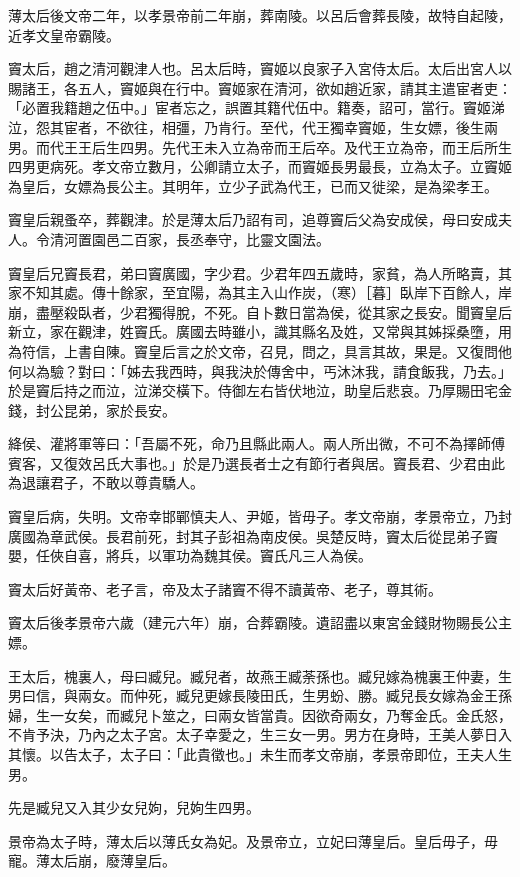 \begin{pinyinscope}
薄太后後文帝二年，以孝景帝前二年崩，葬南陵。以呂后會葬長陵，故特自起陵，近孝文皇帝霸陵。

竇太后，趙之清河觀津人也。呂太后時，竇姬以良家子入宮侍太后。太后出宮人以賜諸王，各五人，竇姬與在行中。竇姬家在清河，欲如趙近家，請其主遣宦者吏：「必置我籍趙之伍中。」宦者忘之，誤置其籍代伍中。籍奏，詔可，當行。竇姬涕泣，怨其宦者，不欲往，相彊，乃肯行。至代，代王獨幸竇姬，生女嫖，後生兩男。而代王王后生四男。先代王未入立為帝而王后卒。及代王立為帝，而王后所生四男更病死。孝文帝立數月，公卿請立太子，而竇姬長男最長，立為太子。立竇姬為皇后，女嫖為長公主。其明年，立少子武為代王，已而又徙梁，是為梁孝王。

竇皇后親蚤卒，葬觀津。於是薄太后乃詔有司，追尊竇后父為安成侯，母曰安成夫人。令清河置園邑二百家，長丞奉守，比靈文園法。

竇皇后兄竇長君，弟曰竇廣國，字少君。少君年四五歲時，家貧，為人所略賣，其家不知其處。傳十餘家，至宜陽，為其主入山作炭，（寒）［暮］臥岸下百餘人，岸崩，盡壓殺臥者，少君獨得脫，不死。自卜數日當為侯，從其家之長安。聞竇皇后新立，家在觀津，姓竇氏。廣國去時雖小，識其縣名及姓，又常與其姊採桑墮，用為符信，上書自陳。竇皇后言之於文帝，召見，問之，具言其故，果是。又復問他何以為驗？對曰：「姊去我西時，與我決於傳舍中，丐沐沐我，請食飯我，乃去。」於是竇后持之而泣，泣涕交橫下。侍御左右皆伏地泣，助皇后悲哀。乃厚賜田宅金錢，封公昆弟，家於長安。

絳侯、灌將軍等曰：「吾屬不死，命乃且縣此兩人。兩人所出微，不可不為擇師傅賓客，又復效呂氏大事也。」於是乃選長者士之有節行者與居。竇長君、少君由此為退讓君子，不敢以尊貴驕人。

竇皇后病，失明。文帝幸邯鄲慎夫人、尹姬，皆毋子。孝文帝崩，孝景帝立，乃封廣國為章武侯。長君前死，封其子彭祖為南皮侯。吳楚反時，竇太后從昆弟子竇嬰，任俠自喜，將兵，以軍功為魏其侯。竇氏凡三人為侯。

竇太后好黃帝、老子言，帝及太子諸竇不得不讀黃帝、老子，尊其術。

竇太后後孝景帝六歲（建元六年）崩，合葬霸陵。遺詔盡以東宮金錢財物賜長公主嫖。

王太后，槐裏人，母曰臧兒。臧兒者，故燕王臧荼孫也。臧兒嫁為槐裏王仲妻，生男曰信，與兩女。而仲死，臧兒更嫁長陵田氏，生男蚡、勝。臧兒長女嫁為金王孫婦，生一女矣，而臧兒卜筮之，曰兩女皆當貴。因欲奇兩女，乃奪金氏。金氏怒，不肯予決，乃內之太子宮。太子幸愛之，生三女一男。男方在身時，王美人夢日入其懷。以告太子，太子曰：「此貴徵也。」未生而孝文帝崩，孝景帝即位，王夫人生男。

先是臧兒又入其少女兒姁，兒姁生四男。

景帝為太子時，薄太后以薄氏女為妃。及景帝立，立妃曰薄皇后。皇后毋子，毋寵。薄太后崩，廢薄皇后。


\end{pinyinscope}
